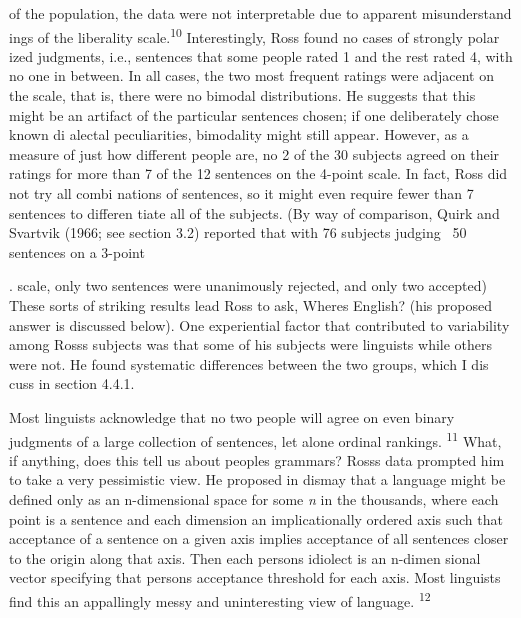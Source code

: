 \begin{styleTextbody}
of the population, the data were not interpretable due to apparent misunderstand\- ings of the liberality scale.\textsuperscript{10}\textsuperscript{ }Interestingly, Ross found no cases of strongly polar\- ized judgments, i.e., sentences that some people rated 1 and the rest rated 4, with no one in between. In all cases, the two most frequent ratings were adjacent on the scale, that is, there were no bimodal distributions. He suggests that this might be an artifact of the particular sentences chosen; if one deliberately chose known di\- alectal peculiarities, bimodality might still appear. However, as a measure of just how different people are, no 2 of the 30 subjects agreed on their ratings for more than 7 of the 12 sentences on the 4-point scale. In fact, Ross did not try all combi\- nations of sentences, so it might even require fewer than 7 sentences to differen\- tiate all of the subjects. (By way of comparison, Quirk and Svartvik (1966; see section 3.2) reported that with 76 subjects judging \ 50 sentences on a 3-point
\end{styleTextbody}


\begin{styleTextbody}
. scale, only two sentences were unanimously rejected, and only two accepted) These sorts of striking results lead Ross to ask, {\textquotedbl}Where{\textquotesingle}s English?{\textquotedbl} (his proposed answer is discussed below). One experiential factor that contributed to variability among Ross{\textquotesingle}s subjects was that some of his subjects were linguists while others were not. He found systematic differences between the two groups, which I dis\- cuss in section 4.4.1.
\end{styleTextbody}


\begin{styleTextbody}
Most linguists acknowledge that no two people will agree on even binary judgments of a large collection of sentences, let alone ordinal rankings. \textsuperscript{11}\textsuperscript{ }What, if anything, does this tell us about people{\textquotesingle}s grammars? Ross{\textquotesingle}s data prompted him to take a very pessimistic view. He proposed in dismay that a language might be defined only as an n-dimensional space for some \textit{n}\textit{ }in the thousands, where each point is a sentence and each dimension an implicationally ordered axis such that acceptance of a sentence on a given axis implies acceptance of all sentences closer to the origin along that axis. Then each person{\textquotesingle}s idiolect is an n-dimen\- sional vector specifying that person{\textquotesingle}s acceptance threshold for each axis. Most linguists find this an appallingly messy and uninteresting view of language. \textsuperscript{12}
\end{styleTextbody}


